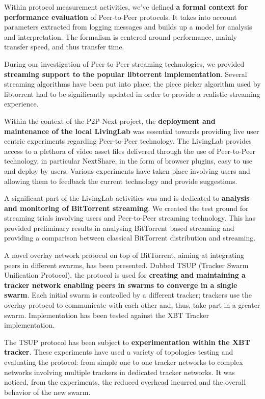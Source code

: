 Within protocol measurement activities, we've defined \textbf{a formal context
for performance evaluation} of Peer-to-Peer protocols. It takes into account
parameters extracted from logging messages and builds up a model for analysis
and interpretation. The formalism is centered around performance, mainly
transfer speed, and thus transfer time.

During our investigation of Peer-to-Peer streaming technologies, we provided
\textbf{streaming support to the popular libtorrent implementation}. Several
streaming algorithms have been put into place; the piece picker algorithm
used by libtorrent had to be significantly updated in order to provide a
realistic streaming experience.

Within the context of the P2P-Next project, the \textbf{deployment and
maintenance of the local LivingLab} was essential towards providing live user
centric experiments regarding Peer-to-Peer technology. The LivingLab provides
access to a plethora of video asset files delivered through the use of
Peer-to-Peer technology, in particular NextShare, in the form of browser
plugins, easy to use and deploy by users. Various experiments have taken place
involving users and allowing them to feedback the current technology and
provide suggestions.

A significant part of the LivingLab activities was and is dedicated to
\textbf{analysis and monitoring of BitTorrent streaming}. We created the test
ground for streaming trials involving users and Peer-to-Peer streaming
technology. This has provided preliminary results in analysing BitTorrent
based streaming and providing a comparison between classical BitTorrent
distribution and streaming.

A novel overlay network protocol on top of BitTorrent, aiming at integrating
peers in different swarms, has been presented. Dubbed TSUP (Tracker Swarm
Unification Protocol), the protocol is used for \textbf{creating and
maintaining a tracker network enabling peers in swarms to converge in a single
swarm}. Each initial swarm is controlled by a different tracker; trackers use
the overlay protocol to communicate with each other and, thus, take part in a
greater swarm. Implementation has been tested against the XBT Tracker
implementation.

The TSUP protocol has been subject to \textbf{experimentation within the XBT
tracker}. These experiments have used a variety of topologies testing and
evaluating the protocol: from simple one to one tracker networks to complex
networks involving multiple trackers in dedicated tracker networks. It was
noticed, from the experiments, the reduced overhead incurred and the overall
behavior of the new swarm.

